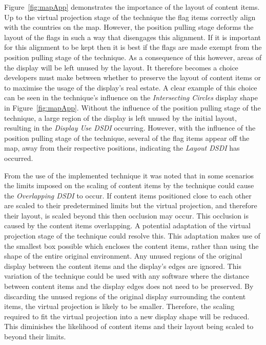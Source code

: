 \documentclass[review,5p,times,twocolumn]{elsarticle}
\begin{document}
Figure~\ref{fig:mapApp} demonstrates the importance of the layout of content items.
Up to the virtual projection stage of the technique the flag items correctly align with the countries on the map.
However, the position pulling stage deforms the layout of the flags in such a way that disengages this alignment.
If it is important for this alignment to be kept then it is best if the flags are made exempt from the position pulling stage of the technique.
As a consequence of this however, areas of the display will be left unused by the layout.
It therefore becomes a choice developers must make between whether to preserve the layout of content items or to maximise the usage of the display's real estate.
A clear example of this choice can be seen in the technique's influence on the {\emph{Intersecting Circles}} display shape in Figure~\ref{fig:mapApp}.
Without the influence of the position pulling stage of the technique, a large region of the display is left unused by the initial layout, resulting in the {\emph{Display Use \ac{DSDI}}} occurring.
However, with the influence of the position pulling stage of the technique, several of the flag items appear off the map, away from their respective positions, indicating the {\emph{Layout \ac{DSDI}}} has occurred.

From the use of the implemented technique it was noted that in some scenarios the limits imposed on the scaling of content items by the technique could cause the {\emph{Overlapping \ac{DSDI}}} to occur.
If content items positioned close to each other are scaled to their predetermined limits but the virtual projection, and therefore their layout, is scaled beyond this then occlusion may occur.
This occlusion is caused by the content items overlapping.
A potential adaptation of the virtual projection stage of the technique could resolve this.  
This adaptation makes use of the smallest box possible which encloses the content items, rather than using the shape of the entire original environment.
Any unused regions of the original display between the content items and the display's edges are ignored.
This variation of the technique could be used with any software where the distance between content items and the display edges does not need to be preserved.
By discarding the unused regions of the original display surrounding the content items, the virtual projection is likely to be smaller.
Therefore, the scaling required to fit the virtual projection into a new display shape will be reduced.
This diminishes the likelihood of content items and their layout being scaled to beyond their limits. 
\end{document}
